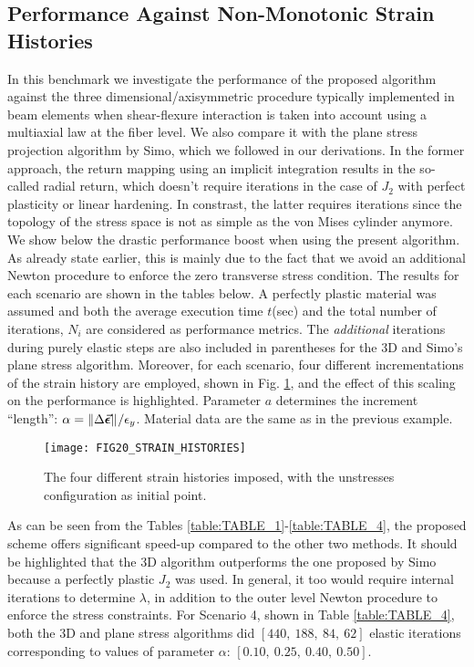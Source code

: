 \subsection{Performance Against Non-Monotonic Strain Histories}

In this benchmark we investigate the performance of the proposed algorithm 
against the three dimensional/axisymmetric procedure typically implemented in 
beam elements when shear-flexure interaction is taken into account using a 
multiaxial law at the fiber level. We also compare it with the plane stress 
projection 
algorithm by Simo\cite{Simo1985}, which we followed in our derivations. In the 
former approach, the return mapping using an implicit integration results in 
the so-called radial return, which doesn't require iterations in the case of 
$J_2$ with perfect plasticity or linear hardening\cite{Wilkins1963}. In 
constrast, the latter requires iterations since the topology of the stress 
space is not as simple as the von Mises cylinder anymore. We show below the 
drastic performance boost when 
using the present algorithm. As already state earlier, this is mainly due to 
the fact that we avoid an additional Newton procedure to enforce the zero 
transverse stress condition. The results for each scenario are shown in the 
tables below. A perfectly plastic material was assumed and both the average 
execution time $t$(sec) and the total number of iterations, $N_i$ are 
considered as performance metrics. The \textit{additional} iterations during 
purely elastic steps are also included in parentheses for the 3D and Simo's 
plane stress algorithm.  Moreover, for each scenario, four 
different incrementations of the strain history are employed, shown in Fig. 
\ref{fig:FIG20_STRAIN_HISTORIES}, and the effect of 
this scaling on the performance is highlighted. Parameter $a$ determines the 
increment ``length'': $\alpha = 
\Vert\Delta\vec{\bm{\epsilon}}\Vert^{}/\epsilon_y$. Material data are the same as 
in the previous example. 

\begin{figure}[t]
	\centering
	\texttt{[image: FIG20\_STRAIN\_HISTORIES]}
	\caption{The four different strain histories imposed, with the unstresses 
		configuration as initial point.}
	\label{fig:FIG20_STRAIN_HISTORIES}
\end{figure}

As can be seen from the Tables \ref{table:TABLE_1}-\ref{table:TABLE_4}, the 
proposed scheme offers significant speed-up compared to the other two methods. 
It should be highlighted that the 3D algorithm outperforms the one proposed by 
Simo because a perfectly plastic $J_2$ was used. In 
general, it too would require internal iterations to determine $\lambda$, in 
addition to the outer level Newton procedure to enforce the stress constraints. 
For Scenario 4, shown in Table \ref{table:TABLE_4}, both the 3D and plane 
stress algorithms did $[440,\ 188,\ 84,\ 62]$ elastic iterations corresponding 
to values of parameter $\alpha$: $[0.10,\ 0.25,\ 0.40,\ 0.50]$.




